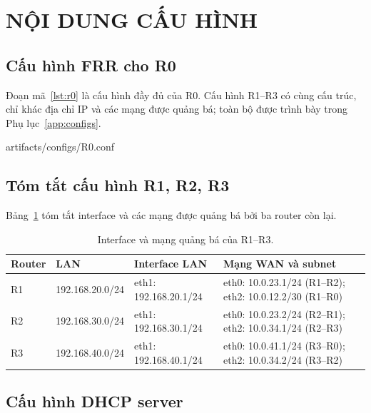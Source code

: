 \documentclass[12pt,a4paper]{article}
\begin{document}
\section{NỘI DUNG CẤU HÌNH}

\subsection{Cấu hình FRR cho R0}

Đoạn mã~\ref{lst:r0} là cấu hình đầy đủ của R0. Cấu hình R1--R3 có cùng cấu trúc, chỉ khác địa
chỉ IP và các mạng được quảng bá; toàn bộ được trình bày trong Phụ lục~\ref{app:configs}.


  {artifacts/configs/R0.conf}

\subsection{Tóm tắt cấu hình R1, R2, R3}

Bảng~\ref{tab:routers} tóm tắt interface và các mạng được quảng bá bởi ba router còn lại.

\begin{table}[H]
  \centering
  \caption{Interface và mạng quảng bá của R1--R3.}
  \label{tab:routers}
  \small
  \begin{tabularx}{\textwidth}{@{}l l l X@{}}
    \toprule
    \textbf{Router} & \textbf{LAN} & \textbf{Interface LAN} & \textbf{Mạng WAN và subnet} \\
    \midrule
    R1 & 192.168.20.0/24 & eth1: 192.168.20.1/24 &
      eth0: 10.0.23.1/24 (R1--R2); eth2: 10.0.12.2/30 (R1--R0) \\
    R2 & 192.168.30.0/24 & eth1: 192.168.30.1/24 &
      eth0: 10.0.23.2/24 (R2--R1); eth2: 10.0.34.1/24 (R2--R3) \\
    R3 & 192.168.40.0/24 & eth1: 192.168.40.1/24 &
      eth0: 10.0.41.1/24 (R3--R0); eth2: 10.0.34.2/24 (R3--R2) \\
    \bottomrule
  \end{tabularx}
\end{table}

\subsection{Cấu hình DHCP server}
\end{document}
